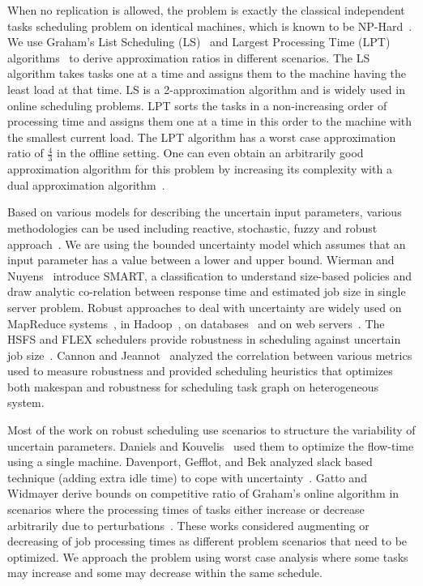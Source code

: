 \documentclass[twocolumn]{svjour3}
\begin{document}
When no replication is allowed, the problem is exactly the classical
independent tasks scheduling problem on identical machines, which is
known to be NP-Hard~\cite{GareyJohnson79}. We use Graham's List
Scheduling (LS)~\cite{Graham66} and Largest Processing Time (LPT)
algorithms~\cite{Graham69boundson} to derive approximation ratios in
different scenarios. The LS algorithm takes tasks one at a time and
assigns them to the machine having the least load at that time. LS is
a 2-approximation algorithm and is widely used in online scheduling
problems. LPT sorts the tasks in a non-increasing order of processing
time and assigns them one at a time in this order to the machine with
the smallest current load. The LPT algorithm has a worst case
approximation ratio of $\frac{4}{3}$ in the offline
setting. One can even obtain an arbitrarily good approximation
algorithm for this problem by increasing its complexity with a dual
approximation algorithm~\cite{Hoch87}.


Based on various models for describing the uncertain input parameters,
various methodologies can be used including reactive, stochastic,
fuzzy and robust approach~\cite{DBLP:journals/cce/LiI08}. We are using
the bounded uncertainty model which assumes that an input parameter
has a value between a lower and upper bound.  Wierman and
Nuyens~\cite{conf/sigmetrics/WiermanN08} introduce SMART, a
classification to understand size-based policies and draw analytic
co-relation between response time and estimated job size in single
server problem. Robust approaches to deal with uncertainty are widely
used on MapReduce
systems~\cite{Kavulya:2010:ATP:1844765.1845224,Verma:2011:AAR:1998582.1998637},
in
Hadoop~\cite{Wolf:2010:FSA:2023718.2023720,White:2009:HDG:1717298},
on databases~\cite{Lipton199518} and on web
servers~\cite{Cardellini99dynamicload}. The HSFS and FLEX schedulers
provide robustness in scheduling against uncertain job
size~\cite{Wolf:2010:FSA:2023718.2023720,6691554}. Cannon and
Jeannot~\cite{cj09c} analyzed the correlation between various metrics
used to measure robustness and provided scheduling heuristics that
optimizes both makespan and robustness for scheduling task graph on
heterogeneous system.

Most of the work on robust scheduling use scenarios to structure
the variability of uncertain parameters. Daniels and
Kouvelis~\cite{citeulike:8334169} used them to optimize the flow-time
using a single machine. Davenport, Gefflot, and Bek analyzed slack
based technique (adding extra idle time) to cope with
uncertainty~\cite{Davenport_slack-basedtechniques}. Gatto and Widmayer
derive bounds on competitive ratio of Graham’s online algorithm in
scenarios where the processing times of tasks either increase or decrease
arbitrarily due to perturbations~\cite{Gatto07}.  These works
considered augmenting or decreasing of job processing times as
different problem scenarios that need to be optimized. We 
approach the problem using worst case analysis where some tasks may
increase and some may decrease within the same schedule.
  
\end{document}
